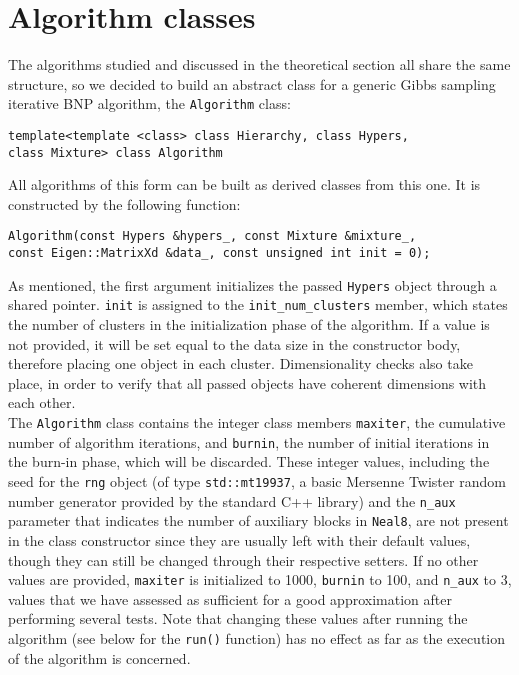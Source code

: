 \section{Algorithm classes}
The algorithms studied and discussed in the theoretical section all share the same structure, so we decided to build an abstract class for a generic Gibbs sampling iterative BNP algorithm, the \verb|Algorithm| class:
\begin{verbatim}
template<template <class> class Hierarchy, class Hypers,
class Mixture> class Algorithm
\end{verbatim}
All algorithms of this form can be built as derived classes from this one.
It is constructed by the following function:
\begin{verbatim}
Algorithm(const Hypers &hypers_, const Mixture &mixture_,
const Eigen::MatrixXd &data_, const unsigned int init = 0);
\end{verbatim}
As mentioned, the first argument initializes the passed \verb|Hypers| object through a shared pointer.
\verb|init| is assigned to the \verb|init_num_clusters| member, which states the number of clusters in the initialization phase of the algorithm.
If a value is not provided, it will be set equal to the data size in the constructor body, therefore placing one object in each cluster.
Dimensionality checks also take place, in order to verify that all passed objects have coherent dimensions with each other. \\
The \verb|Algorithm| class contains the integer class members \verb|maxiter|, the cumulative number of algorithm iterations, and \verb|burnin|, the number of initial iterations in the burn-in phase, which will be discarded.
These integer values, including the seed for the \verb|rng| object (of type \verb|std::mt19937|, a basic Mersenne Twister random number generator provided by the standard C++ library) and the \verb|n_aux| parameter that indicates the number of auxiliary blocks in \verb|Neal8|, are not present in the class constructor since they are usually left with their default values, though they can still be changed through their respective setters.
If no other values are provided, \verb|maxiter| is initialized to 1000, \verb|burnin| to 100, and \verb|n_aux| to 3, values that we have assessed as sufficient for a good approximation after performing several tests.
Note that changing these values after running the algorithm (see below for the \verb|run()| function) has no effect as far as the execution of the algorithm is concerned. \\

